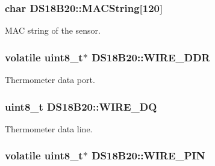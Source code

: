 \subsubsection[{\texorpdfstring{M\+A\+C\+String}{MACString}}]{\setlength{\rightskip}{0pt plus 5cm}char D\+S18\+B20\+::\+M\+A\+C\+String\mbox{[}120\mbox{]}\hspace{0.3cm}{\ttfamily [private]}}\hypertarget{classDS18B20_a6884de10b175289718239bdac0b8e52e}{}\label{classDS18B20_a6884de10b175289718239bdac0b8e52e}


M\+AC string of the sensor. 

\subsubsection[{\texorpdfstring{W\+I\+R\+E\+\_\+\+D\+DR}{WIRE_DDR}}]{\setlength{\rightskip}{0pt plus 5cm}volatile uint8\+\_\+t$\ast$ D\+S18\+B20\+::\+W\+I\+R\+E\+\_\+\+D\+DR\hspace{0.3cm}{\ttfamily [private]}}\hypertarget{classDS18B20_a06a1f548d087b8d8971dee5e94653f5c}{}\label{classDS18B20_a06a1f548d087b8d8971dee5e94653f5c}


Thermometer data port. 

\subsubsection[{\texorpdfstring{W\+I\+R\+E\+\_\+\+DQ}{WIRE_DQ}}]{\setlength{\rightskip}{0pt plus 5cm}uint8\+\_\+t D\+S18\+B20\+::\+W\+I\+R\+E\+\_\+\+DQ\hspace{0.3cm}{\ttfamily [private]}}\hypertarget{classDS18B20_aebc6a6ab3c604f19dac9a24ef3301938}{}\label{classDS18B20_aebc6a6ab3c604f19dac9a24ef3301938}


Thermometer data line. 

\subsubsection[{\texorpdfstring{W\+I\+R\+E\+\_\+\+P\+IN}{WIRE_PIN}}]{\setlength{\rightskip}{0pt plus 5cm}volatile uint8\+\_\+t$\ast$ D\+S18\+B20\+::\+W\+I\+R\+E\+\_\+\+P\+IN\hspace{0.3cm}{\ttfamily [private]}}\hypertarget{classDS18B20_a03a1ad890f9713fc10dc353c9779a7f2}{}\label{classDS18B20_a03a1ad890f9713fc10dc353c9779a7f2}


